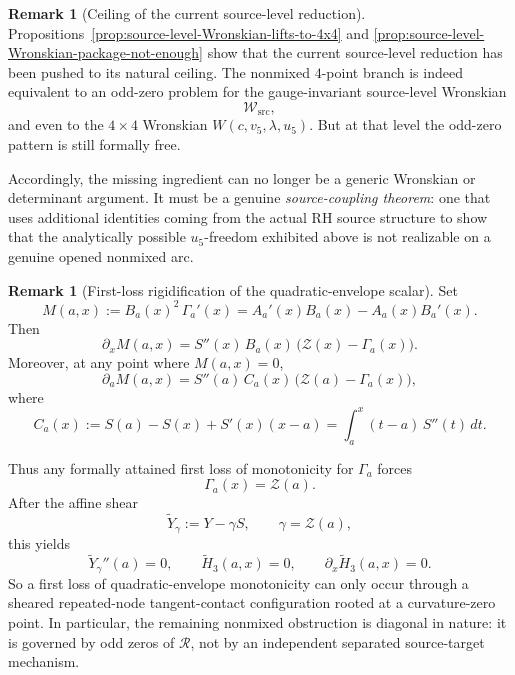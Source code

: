 \documentclass[11pt,a4paper]{amsart}
\theoremstyle{plain}
\theoremstyle{definition}
\newtheorem{remark}[theorem]{Remark}
\begin{document}
\begin{remark}[Ceiling of the current source-level reduction]
\label{rem:ceiling-of-current-source-level-reduction}
Propositions~\ref{prop:source-level-Wronskian-lifts-to-4x4} and
\ref{prop:source-level-Wronskian-package-not-enough} show that the current
source-level reduction has been pushed to its natural ceiling.  The nonmixed
$4$-point branch is indeed equivalent to an odd-zero problem for the
gauge-invariant source-level Wronskian
\[
\mathcal W_{\mathrm{src}},
\]
and even to the $4\times4$ Wronskian $W(c,v_5,\lambda,u_5)$.  But at that
level the odd-zero pattern is still formally free.

Accordingly, the missing ingredient can no longer be a generic Wronskian or
determinant argument.  It must be a genuine \emph{source-coupling theorem}:
one that uses additional identities coming from the actual RH source structure
to show that the analytically possible $u_5$-freedom exhibited above is not
realizable on a genuine opened nonmixed arc.
\end{remark}

\begin{remark}[First-loss rigidification of the quadratic-envelope scalar]
\label{rem:first-loss-rigidification-nonmixed}
Set
\[
M(a,x):=B_a(x)^2\,\Gamma_a'(x)=A_a'(x)B_a(x)-A_a(x)B_a'(x).
\]
Then
\[
\partial_x M(a,x)=S''(x)\,B_a(x)\,\bigl(\mathcal Z(x)-\Gamma_a(x)\bigr).
\]
Moreover, at any point where $M(a,x)=0$,
\[
\partial_a M(a,x)=S''(a)\,C_a(x)\,\bigl(\mathcal Z(a)-\Gamma_a(x)\bigr),
\]
where
\[
C_a(x):=S(a)-S(x)+S'(x)(x-a)=\int_a^x (t-a)\,S''(t)\,dt.
\]

Thus any formally attained first loss of monotonicity for $\Gamma_a$ forces
\[
\Gamma_a(x)=\mathcal Z(a).
\]
After the affine shear
\[
\widetilde Y_\gamma:=Y-\gamma S,
\qquad \gamma=\mathcal Z(a),
\]
this yields
\[
\widetilde Y_\gamma''(a)=0,
\qquad
\widetilde H_3(a,x)=0,
\qquad
\partial_x\widetilde H_3(a,x)=0.
\]
So a first loss of quadratic-envelope monotonicity can only occur through a
sheared repeated-node tangent-contact configuration rooted at a curvature-zero
point. In particular, the remaining nonmixed obstruction is diagonal in nature:
it is governed by odd zeros of $\mathcal R$, not by an independent separated
source-target mechanism.
\end{remark}
\end{document}
